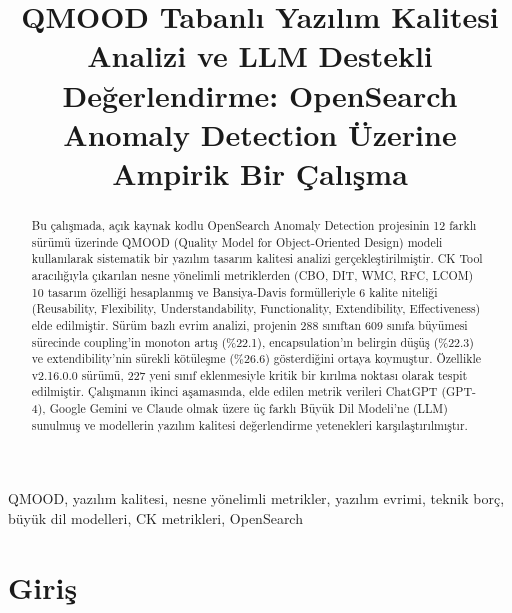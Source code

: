 \documentclass[conference]{IEEEtran}
\begin{document}
\title{QMOOD Tabanl{\i} Yaz{\i}l{\i}m Kalitesi Analizi ve LLM Destekli De\u{g}erlendirme: OpenSearch Anomaly Detection \"Uzerine Ampirik Bir \c{C}al{\i}\c{s}ma}

\author{
}

\maketitle

\begin{abstract}
Bu \c{c}al{\i}\c{s}mada, a\c{c}{\i}k kaynak kodlu OpenSearch Anomaly Detection projesinin 12 farkl{\i} s\"ur\"um\"u \"uzerinde QMOOD (Quality Model for Object-Oriented Design) modeli kullan{\i}larak sistematik bir yaz{\i}l{\i}m tasar{\i}m kalitesi analizi ger\c{c}ekle\c{s}tirilmi\c{s}tir. CK Tool arac{\i}l{\i}\u{g}{\i}yla \c{c}{\i}kar{\i}lan nesne y\"onelimli metriklerden (CBO, DIT, WMC, RFC, LCOM) 10 tasar{\i}m \"ozelli\u{g}i hesaplanm{\i}\c{s} ve Bansiya-Davis form\"ulleriyle 6 kalite niteli\u{g}i (Reusability, Flexibility, Understandability, Functionality, Extendibility, Effectiveness) elde edilmi\c{s}tir. S\"ur\"um bazl{\i} evrim analizi, projenin 288 s{\i}n{\i}ftan 609 s{\i}n{\i}fa b\"uy\"umesi s\"urecinde coupling'in monoton art{\i}\c{s} (\%22.1), encapsulation'{\i}n belirgin d\"u\c{s}\"u\c{s} (\%22.3) ve extendibility'nin s\"urekli k\"ot\"ule\c{s}me (\%26.6) g\"osterdi\u{g}ini ortaya koymu\c{s}tur. \"Ozellikle v2.16.0.0 s\"ur\"um\"u, 227 yeni s{\i}n{\i}f eklenmesiyle kritik bir k{\i}r{\i}lma noktas{\i} olarak tespit edilmi\c{s}tir. \c{C}al{\i}\c{s}man{\i}n ikinci a\c{s}amas{\i}nda, elde edilen metrik verileri ChatGPT (GPT-4), Google Gemini ve Claude olmak \"uzere \"u\c{c} farkl{\i} B\"uy\"uk Dil Modeli'ne (LLM) sunulmu\c{s} ve modellerin yaz{\i}l{\i}m kalitesi de\u{g}erlendirme yetenekleri kar\c{s}{\i}la\c{s}t{\i}r{\i}lm{\i}\c{s}t{\i}r.
\end{abstract}

\begin{IEEEkeywords}
QMOOD, yaz{\i}l{\i}m kalitesi, nesne y\"onelimli metrikler, yaz{\i}l{\i}m evrimi, teknik bor\c{c}, b\"uy\"uk dil modelleri, CK metrikleri, OpenSearch
\end{IEEEkeywords}

\section{Giri\c{s}}
\end{document}
